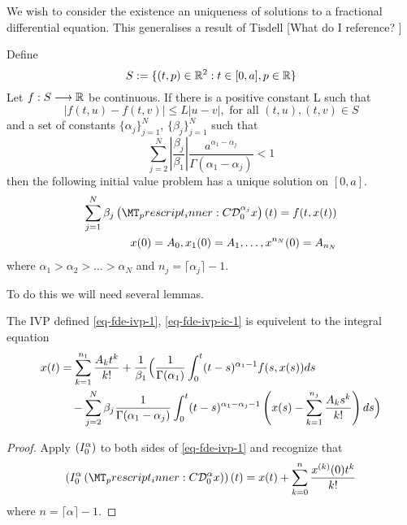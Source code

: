 \documentclass{article}
\begin{document}
\setlength\parindent{0pt}
\setlength{\parskip}{5mm plus4mm minus3mm}
\fancyfoot[r]{\today}


We wish to consider the existence an uniqueness of solutions to a fractional differential equation. 
This generalises a result of Tisdell [What do I reference? ]

\label{thm-existence-uniq}
\begin{theorem}
	Define
		$$ S:= \{ (t,p) \in \mathbb{R}^2 : t \in [0, a], p \in \mathbb{R} \} $$
	Let $ f : S \longrightarrow \mathbb{R} $ be continuous. If there is a positive constant L such that 
		$$ |f(t,u) - f(t,v)| \leq L|u-v|, \text{ for all } (t,u), (t,v) \in S $$
	and a set of constants $ \{ \alpha_j \}_{j = 1}^{N} $, $ \{ \beta_j \}_{j=1}^N $
	such that
	$$
		\sum_{j=2}^N \left|\frac{\beta_j}{\beta_1}\right| \frac{a^{\alpha_1 - \alpha_j}}{\Gamma(\alpha_1 - \alpha_j)} < 1
	$$
	then the following initial value problem has a unique solution on $ [0, a] $.
	\begin{align}
		\label{eq-fde-ivp-1}
		\sum_{j=1}^{N} \beta_j\capder{0}{\alpha_j}{x}(t) = f(t,x(t)) \\
		\label{eq-fde-ivp-ic-1}
		x(0) = A_0, x_1(0) = A_1, \ldots, x^{n_N}(0) = A_{n_N}
	\end{align}
	where $ \alpha_1 > \alpha_2 > \ldots > \alpha_N $
	and $ n_j = \lceil \alpha_j \rceil - 1 $.
\end{theorem}
To do this we will need several lemmas. 

\begin{lemma}
	The IVP defined \eqref{eq-fde-ivp-1}, \eqref{eq-fde-ivp-ic-1} is equivelent to the integral equation
	\begin{align*}
		x(t) &= \sum_{k=1}^{n_1}\frac{A_kt^k}{k!} + \frac{1}{\beta_1} \Bigl( \frac{1}{\Gamma(\alpha_1)}\int_{0}^{t} (t-s)^{\alpha_1 - 1}f(s,x(s))ds \\
			& \ \ \ - \sum_{j=2}^{N}\beta_j \frac{1}{\Gamma(\alpha_1 - \alpha_j)}
			\int_{0}^{t}(t-s)^{\alpha_1 - \alpha_j - 1}\left(x(s) - \sum_{k=1}^{n_j}\frac{A_ks^k}{k!} \right) ds \Bigr)
	\end{align*}
\end{lemma}
\begin{proof}
	Apply $ \left( I_{0}^{\alpha}  \right) $ to both sides of \eqref{eq-fde-ivp-1} and recognize that
	$$
		\rli{0}{\alpha}{\capder{0}{\alpha}{x}}(t) = x(t) + \sum_{k=0}^{n} \frac{x^{(k)}(0)t^{k}}{k!}
	$$
	where $ n = \lceil \alpha \rceil - 1 $.
\end{proof}
\end{document}
